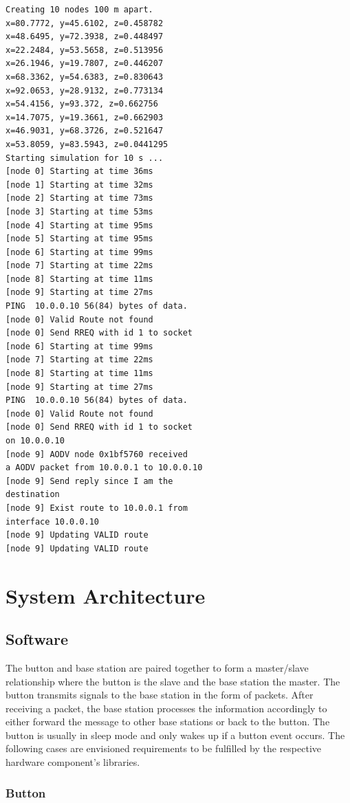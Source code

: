 \documentclass[journal,compsoc]{IEEEtran}
\begin{document}
\begin{lstlisting}
Creating 10 nodes 100 m apart.
x=80.7772, y=45.6102, z=0.458782
x=48.6495, y=72.3938, z=0.448497
x=22.2484, y=53.5658, z=0.513956
x=26.1946, y=19.7807, z=0.446207
x=68.3362, y=54.6383, z=0.830643
x=92.0653, y=28.9132, z=0.773134
x=54.4156, y=93.372, z=0.662756
x=14.7075, y=19.3661, z=0.662903
x=46.9031, y=68.3726, z=0.521647
x=53.8059, y=83.5943, z=0.0441295
Starting simulation for 10 s ...
[node 0] Starting at time 36ms
[node 1] Starting at time 32ms
[node 2] Starting at time 73ms
[node 3] Starting at time 53ms
[node 4] Starting at time 95ms
[node 5] Starting at time 95ms
[node 6] Starting at time 99ms
[node 7] Starting at time 22ms
[node 8] Starting at time 11ms
[node 9] Starting at time 27ms
PING  10.0.0.10 56(84) bytes of data.
[node 0] Valid Route not found
[node 0] Send RREQ with id 1 to socket
[node 6] Starting at time 99ms
[node 7] Starting at time 22ms
[node 8] Starting at time 11ms
[node 9] Starting at time 27ms
PING  10.0.0.10 56(84) bytes of data.
[node 0] Valid Route not found
[node 0] Send RREQ with id 1 to socket
on 10.0.0.10
[node 9] AODV node 0x1bf5760 received 
a AODV packet from 10.0.0.1 to 10.0.0.10
[node 9] Send reply since I am the 
destination
[node 9] Exist route to 10.0.0.1 from 
interface 10.0.0.10
[node 9] Updating VALID route
[node 9] Updating VALID route
\end{lstlisting}

\section{System Architecture}

\subsection{Software}

The button and base station are paired together to form a master/slave relationship where the button is the slave and the base station the master.  The button transmits signals to the base station in the form of packets.  After receiving a packet, the base station processes the information accordingly to either forward the message to other base stations or back to the button.  The button is usually in sleep mode and only wakes up if a button event occurs.  The following cases are envisioned requirements to be fulfilled by the respective hardware component’s libraries.

\subsubsection{Button}
\end{document}
